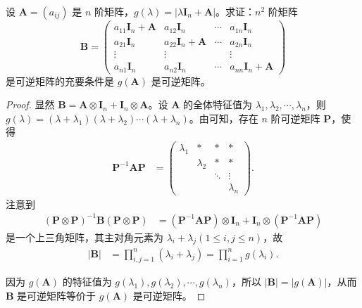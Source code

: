 \documentclass[../../main.tex]{subfiles}%
\begin{document}
\begin{example}
设 $\boldsymbol{A} = (a_{ij})$ 是 $n$ 阶矩阵，$g(\lambda) = |\lambda\boldsymbol{I}_n + \boldsymbol{A}|$。求证：$n^2$ 阶矩阵
\[
\boldsymbol{B} = 
\begin{pmatrix}
a_{11}\boldsymbol{I}_n + \boldsymbol{A} & a_{12}\boldsymbol{I}_n & \cdots & a_{1n}\boldsymbol{I}_n \\
a_{21}\boldsymbol{I}_n & a_{22}\boldsymbol{I}_n + \boldsymbol{A} & \cdots & a_{2n}\boldsymbol{I}_n \\
\vdots & \vdots & & \vdots \\
a_{n1}\boldsymbol{I}_n & a_{n2}\boldsymbol{I}_n & \cdots & a_{nn}\boldsymbol{I}_n + \boldsymbol{A}
\end{pmatrix}
\]
是可逆矩阵的充要条件是 $g(\boldsymbol{A})$ 是可逆矩阵。
\end{example}
\begin{proof}
显然 $\boldsymbol{B} = \boldsymbol{A} \otimes \boldsymbol{I}_n + \boldsymbol{I}_n \otimes \boldsymbol{A}$。设 $\boldsymbol{A}$ 的全体特征值为 $\lambda_1, \lambda_2, \cdots, \lambda_n$，则 $g(\lambda) = (\lambda + \lambda_1)(\lambda + \lambda_2)\cdots(\lambda + \lambda_n)$。由可知，存在 $n$ 阶可逆矩阵 $\boldsymbol{P}$，使得
\begin{align*}
\boldsymbol{P}^{-1}\boldsymbol{AP} &= 
\begin{pmatrix}
\lambda_1 & * & * & * \\
 & \lambda_2 & * & * \\
 & & \ddots & \vdots \\
 & & & \lambda_n
\end{pmatrix}.
\end{align*}
注意到
\begin{align*}
(\boldsymbol{P} \otimes \boldsymbol{P})^{-1}\boldsymbol{B}(\boldsymbol{P} \otimes \boldsymbol{P}) &= (\boldsymbol{P}^{-1}\boldsymbol{AP}) \otimes \boldsymbol{I}_n + \boldsymbol{I}_n \otimes (\boldsymbol{P}^{-1}\boldsymbol{AP})
\end{align*}
是一个上三角矩阵，其主对角元素为 $\lambda_i + \lambda_j (1 \leqslant  i, j \leqslant  n)$，故
\begin{align*}
|\boldsymbol{B}| &= \prod_{i,j = 1}^{n} (\lambda_i + \lambda_j) = \prod_{i = 1}^{n} g(\lambda_i).
\end{align*}

因为 $g(\boldsymbol{A})$ 的特征值为 $g(\lambda_1), g(\lambda_2), \cdots, g(\lambda_n)$，所以 $|\boldsymbol{B}| = |g(\boldsymbol{A})|$，从而 $\boldsymbol{B}$ 是可逆矩阵等价于 $g(\boldsymbol{A})$ 是可逆矩阵。
\end{proof}
\end{document}
